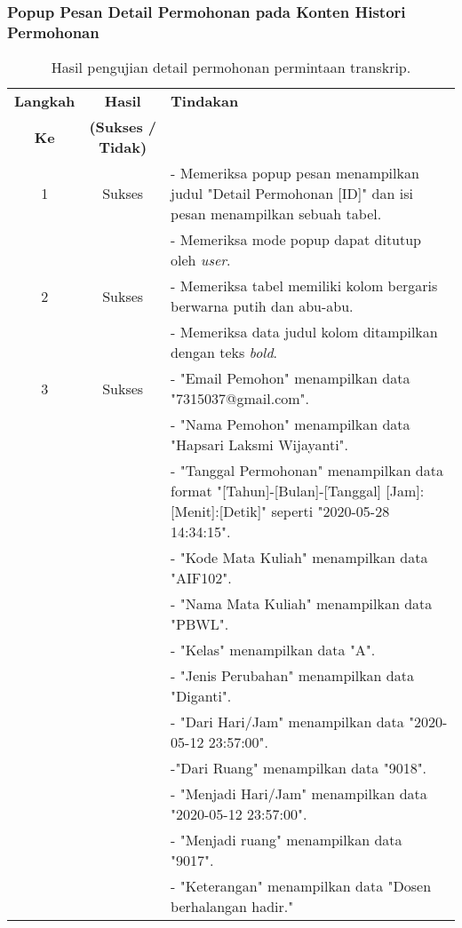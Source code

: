 \subsubsection{Popup Pesan Detail Permohonan pada Konten Histori Permohonan}
\begin{table}[H]
	\centering 
	\caption{Hasil pengujian detail permohonan permintaan transkrip.}
	\label{hasil:DetailHistoriPermohonan}
	\begin{tabular}{|c| c| p{}|}
		\toprule
		\textbf{Langkah} & \textbf{Hasil} & \textbf{Tindakan}\\
		\textbf{Ke} & \textbf{(Sukses / Tidak)} &\\
		\midrule
		1&Sukses& - Memeriksa popup pesan menampilkan judul "Detail Permohonan [ID]" dan isi pesan menampilkan sebuah tabel.\\
		&& - Memeriksa mode popup dapat ditutup oleh \textit{user}.\\
		\hline
		2&Sukses&- Memeriksa tabel memiliki kolom bergaris berwarna putih dan abu-abu.\\
		&& - Memeriksa data judul kolom ditampilkan dengan teks \textit{bold}.	\\	
		\hline
		3&Sukses&- "Email Pemohon" menampilkan data "7315037@gmail.com".\\
		&&- "Nama Pemohon" menampilkan data "Hapsari Laksmi Wijayanti".\\
		&&- "Tanggal Permohonan" menampilkan data format "[Tahun]-[Bulan]-[Tanggal] [Jam]:[Menit]:[Detik]" seperti "2020-05-28 14:34:15".\\
		&&- "Kode Mata Kuliah" menampilkan data "AIF102".\\
		&&- "Nama Mata Kuliah" menampilkan data "PBWL".\\
		&&- "Kelas" menampilkan data "A".\\
		&&- "Jenis Perubahan" menampilkan data "Diganti".\\
		&&- "Dari Hari/Jam" menampilkan data "2020-05-12 23:57:00".\\
		&& -"Dari Ruang" menampilkan data "9018".\\
		&&- "Menjadi Hari/Jam" menampilkan data "2020-05-12 23:57:00".\\
		&&- "Menjadi ruang" menampilkan data "9017".\\
		&&- "Keterangan" menampilkan data "Dosen berhalangan hadir."\\
		\bottomrule		
	\end{tabular} 
\end{table}

